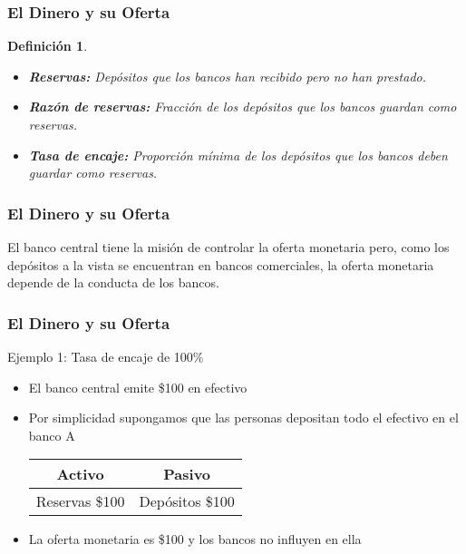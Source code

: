 \documentclass[dvipsnames,table,leqno]{beamer}
\newtheorem{mydef}{Definición}
\begin{document}
		\begin{frame}
			\frametitle{El Dinero y su Oferta}
			\begin{mydef}
				\begin{itemize}
					\item \textbf{Reservas:} Depósitos que los bancos han recibido pero no han prestado.
					\item \textbf{Razón de reservas:} Fracción de los depósitos que los bancos guardan como reservas.
					\item \textbf{Tasa de encaje:} Proporción mínima de los depósitos que los bancos deben guardar como reservas.
				\end{itemize}
			\end{mydef}
		\end{frame}	

		\begin{frame}
			\frametitle{El Dinero y su Oferta}
			El banco central tiene la misión de controlar la oferta monetaria pero, como los depósitos a la vista se encuentran en bancos comerciales, la oferta monetaria depende de la conducta de los bancos.
		\end{frame}	

		\begin{frame}
			\frametitle{El Dinero y su Oferta}
			Ejemplo 1: Tasa de encaje de 100\%
			\begin{itemize}
				\item El banco central emite \$100 en efectivo
				\item Por simplicidad supongamos que las personas depositan todo el efectivo en el banco A
							\begin{table}[htbp!]
								\centering
									\begin{tabular}{|c|c|}\hline
										\textbf{Activo} & \textbf{Pasivo} \\ [1ex] \hline
										Reservas \$100& Depósitos \$100 \\ [1ex] \hline 
									\end{tabular}%
							\end{table}
				\item La oferta monetaria es \$100 y los bancos no influyen en ella
			\end{itemize}
		\end{frame}	
\end{document}
